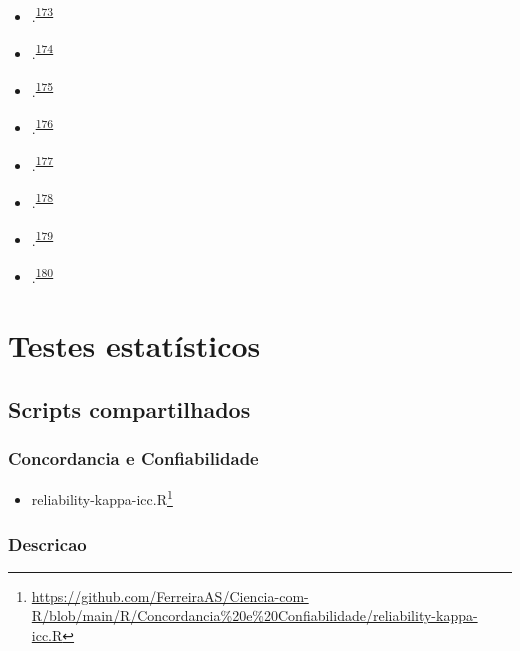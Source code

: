 \documentclass[
  a4paper,
]{book}
\providecommand{\tightlist}{%
  \setlength{\itemsep}{0pt}\setlength{\parskip}{0pt}}
\renewcommand{\href}[2]{#2\footnote{\url{#1}}}
\begin{document}
\begin{itemize}
\item
  .\textsuperscript{\protect\hyperlink{ref-dwivedi2019}{173}}
\item
  .\textsuperscript{\protect\hyperlink{ref-Dwivedi2022}{174}}
\item
  .\textsuperscript{\protect\hyperlink{ref-Kim2017}{175}}
\item
  .\textsuperscript{\protect\hyperlink{ref-marusteri2010}{176}}
\item
  .\textsuperscript{\protect\hyperlink{ref-mishra2019}{177}}
\item
  .\textsuperscript{\protect\hyperlink{ref-ray2021}{178}}
\item
  .\textsuperscript{\protect\hyperlink{ref-nayak2011}{179}}
\item
  .\textsuperscript{\protect\hyperlink{ref-shankar2014}{180}}
\end{itemize}

\hypertarget{testes-estatisticos}{%
\chapter{\texorpdfstring{\textbf{Testes estatísticos}}{Testes estatísticos}}\label{testes-estatisticos}}

\hypertarget{scripts-compartilhados}{%
\section{Scripts compartilhados}\label{scripts-compartilhados}}

\hypertarget{concordancia-e-confiabilidade}{%
\subsection{Concordancia e Confiabilidade}\label{concordancia-e-confiabilidade}}

\begin{itemize}
\tightlist
\item
  \href{https://github.com/FerreiraAS/Ciencia-com-R/blob/main/R/Concordancia\%20e\%20Confiabilidade/reliability-kappa-icc.R}{reliability-kappa-icc.R}
\end{itemize}

\hypertarget{descricao}{%
\subsection{Descricao}\label{descricao}}
\end{document}
